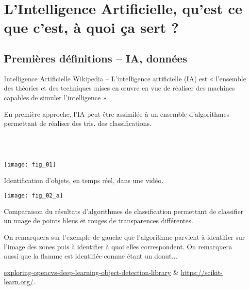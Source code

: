 \def\xxfigures{

}%


\vspace{2cm}
\pagestyle{fancy}
\thispagestyle{plain}


\section{L'Intelligence Artificielle, qu'est ce que c'est, à quoi ça sert ?}

\subsection{Premières définitions -- IA, données}
\begin{defi}{Intelligence Artificielle}
Wikipedia -- L'intelligence artificielle (IA) est « l'ensemble des théories et des techniques mises en œuvre en vue de réaliser des machines capables de simuler l'intelligence ». 
\end{defi}

En première approche, l'IA peut être assimilée à un ensemble d'algorithmes permettant de réaliser des tris, des classifications.
\begin{exemple}~\\
\\
\vspace{-1cm}

\begin{multicols}{2}
\begin{center}
\texttt{[image: fig\_01]}
\end{center}
Identification d'objets, en temps réel, dans une vidéo.

\begin{center}
\texttt{[image: fig\_02\_a]}
\end{center}


Comparaison du résultats d'algorithmes de classification permettant de classifier un nuage de points bleus et rouges de transparences différentes.
\end{multicols}

On remarquera sur l'exemple de gauche que l'algorithme parvient à identifier sur l'image des zones puis à identifier à quoi elles correspondent. On remarquera aussi que la flamme est identifiée comme étant un donut...


\begin{flushright}
\footnotesize
\url{exploring-opencvs-deep-learning-object-detection-library} \&  \url{https://scikit-learn.org/}.
\normalsize

\end{flushright}
\end{exemple}




